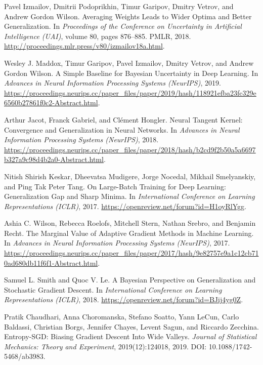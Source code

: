 \begin{thebibliography}{99}
Pavel Izmailov, Dmitrii Podoprikhin, Timur Garipov, Dmitry Vetrov, and Andrew Gordon Wilson.
\newblock Averaging Weights Leads to Wider Optima and Better Generalization.
\newblock In \emph{Proceedings of the Conference on Uncertainty in Artificial Intelligence (UAI)}, volume 80, pages 876--885. PMLR, 2018.
\newblock \url{http://proceedings.mlr.press/v80/izmailov18a.html}.

Wesley J. Maddox, Timur Garipov, Pavel Izmailov, Dmitry Vetrov, and Andrew Gordon Wilson.
\newblock A Simple Baseline for Bayesian Uncertainty in Deep Learning.
\newblock In \emph{Advances in Neural Information Processing Systems (NeurIPS)}, 2019.
\newblock \url{https://proceedings.neurips.cc/paper_files/paper/2019/hash/118921efba23fc329e6560b27861f0c2-Abstract.html}.

Arthur Jacot, Franck Gabriel, and Clément Hongler.
\newblock Neural Tangent Kernel: Convergence and Generalization in Neural Networks.
\newblock In \emph{Advances in Neural Information Processing Systems (NeurIPS)}, 2018.
\newblock \url{https://proceedings.neurips.cc/paper_files/paper/2018/hash/b2cd9f2b50a5a6697b327a9c98d4b2a0-Abstract.html}.

Nitish Shirish Keskar, Dheevatsa Mudigere, Jorge Nocedal, Mikhail Smelyanskiy, and Ping Tak Peter Tang.
\newblock On Large-Batch Training for Deep Learning: Generalization Gap and Sharp Minima.
\newblock In \emph{International Conference on Learning Representations (ICLR)}, 2017.
\newblock \url{https://openreview.net/forum?id=H1oyRlYgg}.

Ashia C. Wilson, Rebecca Roelofs, Mitchell Stern, Nathan Srebro, and Benjamin Recht.
\newblock The Marginal Value of Adaptive Gradient Methods in Machine Learning.
\newblock In \emph{Advances in Neural Information Processing Systems (NeurIPS)}, 2017.
\newblock \url{https://proceedings.neurips.cc/paper_files/paper/2017/hash/9e82757e9a1c12cb710ad680db11f6f1-Abstract.html}.

Samuel L. Smith and Quoc V. Le.
\newblock A Bayesian Perspective on Generalization and Stochastic Gradient Descent.
\newblock In \emph{International Conference on Learning Representations (ICLR)}, 2018.
\newblock \url{https://openreview.net/forum?id=BJij4yg0Z}.

Pratik Chaudhari, Anna Choromanska, Stefano Soatto, Yann LeCun, Carlo Baldassi, Christian Borgs, Jennifer Chayes, Levent Sagun, and Riccardo Zecchina.
\newblock Entropy-SGD: Biasing Gradient Descent Into Wide Valleys.
\newblock \emph{Journal of Statistical Mechanics: Theory and Experiment}, 2019(12):124018, 2019.
\newblock DOI: 10.1088/1742-5468/ab3983.


\end{thebibliography}

